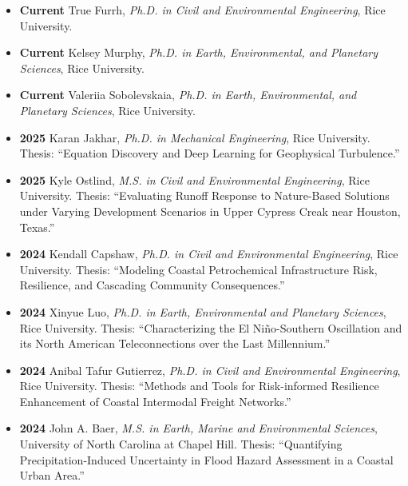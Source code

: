 \documentclass[10pt,oneside]{article}
\begin{document}
\mbox{}\vspace{-\dimexpr\baselineskip\relax}

\begin{itemize}[label={}]


  \item \textbf{Current} True Furrh, \textit{Ph.D. in Civil and Environmental Engineering}, Rice University.

  \item \textbf{Current} Kelsey Murphy, \textit{Ph.D. in Earth, Environmental, and Planetary Sciences}, Rice University.

  \item \textbf{Current} Valeriia Sobolevskaia, \textit{Ph.D. in Earth, Environmental, and Planetary Sciences}, Rice University.



  \item \textbf{2025} \quad Karan Jakhar, \textit{Ph.D. in Mechanical Engineering}, Rice University. Thesis: \enquote{Equation Discovery and Deep Learning for Geophysical Turbulence.}

  \item \textbf{2025} \quad Kyle Ostlind, \textit{M.S. in Civil and Environmental Engineering}, Rice University. Thesis: \enquote{Evaluating Runoff Response to Nature-Based Solutions under Varying Development Scenarios in Upper Cypress Creak near Houston, Texas.}

  \item \textbf{2024} \quad Kendall Capshaw, \textit{Ph.D. in Civil and Environmental Engineering}, Rice University. Thesis: \enquote{Modeling Coastal Petrochemical Infrastructure Risk, Resilience, and Cascading Community Consequences.}

  \item \textbf{2024} \quad Xinyue Luo, \textit{Ph.D. in Earth, Environmental and Planetary Sciences}, Rice University. Thesis: \enquote{Characterizing the El Niño-Southern Oscillation and its North American Teleconnections over the Last Millennium.}

  \item \textbf{2024} \quad Anibal Tafur Gutierrez, \textit{Ph.D. in Civil and Environmental Engineering}, Rice University. Thesis: \enquote{Methods and Tools for Risk-informed Resilience Enhancement of Coastal Intermodal Freight Networks.}

  \item \textbf{2024} \quad John A. Baer, \textit{M.S. in Earth, Marine and Environmental Sciences}, University of North Carolina at Chapel Hill. Thesis: \enquote{Quantifying Precipitation-Induced Uncertainty in Flood Hazard Assessment in a Coastal Urban Area.}


\end{itemize}
\end{document}

